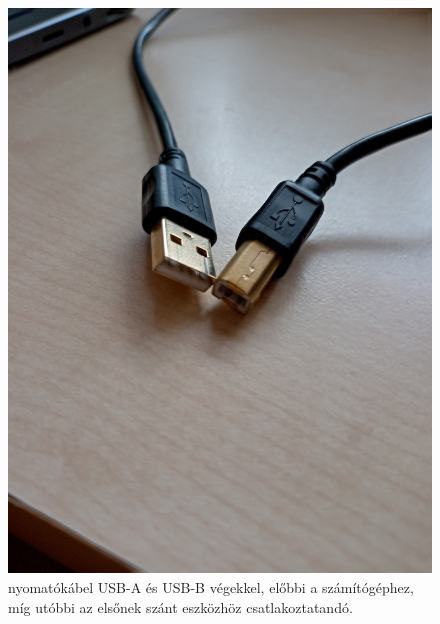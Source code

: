 \documentclass[tocnopagenum]{thesis-ekf}
\theoremstyle{definition}
\theoremstyle{remark}
\begin{document}
	\begin{figure}[h!]
		\centering
		\includegraphics[scale=0.075]{images/foto_usbab.jpg}
		\caption{nyomatókábel USB-A és USB-B végekkel, előbbi a számítógéphez, míg utóbbi az elsőnek szánt eszközhöz csatlakoztatandó.}
		\label{fig:foto_usbab}
	\end{figure}		
	
\end{document}
